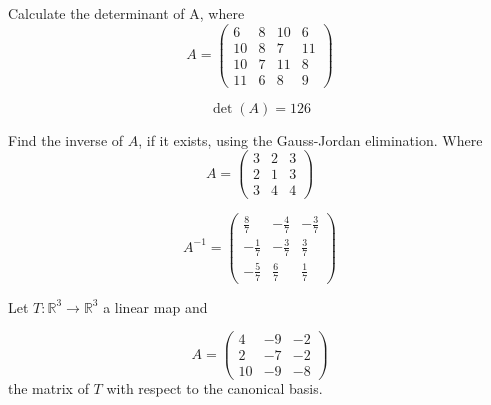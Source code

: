 \begin{questions}

\question Calculate the determinant of A, where
$$
A=\left(\begin{array}{rrrr}
6 & 8 & 10 & 6 \\
10 & 8 & 7 & 11 \\
10 & 7 & 11 & 8 \\
11 & 6 & 8 & 9
\end{array}\right)
$$

\begin{solution}
$$\det(A)=126$$
\end{solution}

\question Find the inverse of $A$, if it exists, using the Gauss-Jordan elimination. Where
$$
A=\left(\begin{array}{rrr}
3 & 2 & 3 \\
2 & 1 & 3 \\
3 & 4 & 4
\end{array}\right)
$$

\begin{solution}
$$A^{-1}=\left(\begin{array}{rrr}
\frac{8}{7} & -\frac{4}{7} & -\frac{3}{7} \\
-\frac{1}{7} & -\frac{3}{7} & \frac{3}{7} \\
-\frac{5}{7} & \frac{6}{7} & \frac{1}{7}
\end{array}\right)$$
\end{solution}

\question Let $T:\mathbb{R}^3\rightarrow\mathbb{R}^3$  a linear map and
 
$$
A=\left(\begin{array}{rrr}
4 & -9 & -2 \\
2 & -7 & -2 \\
10 & -9 & -8
\end{array}\right)
$$
the matrix of $T$ with respect to the canonical basis.
\end{questions}
